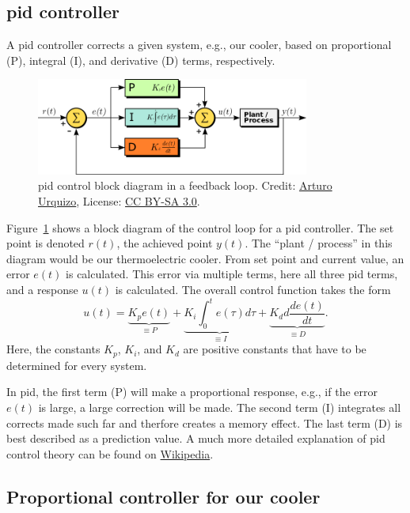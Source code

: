 \subsection{\ac{pid} controller}

A \ac{pid} controller corrects a given system, e.g., our cooler, based on proportional (P), integral (I), and derivative (D) terms, respectively. 
\begin{figure}[tb]
  \centering
  \includegraphics[width=0.8\textwidth]{graphics/06_further/pid.png}
  \caption{\ac{pid} control block diagram in a feedback loop. Credit: \href{https://en.wikipedia.org/wiki/File:PID_en.svg}{Arturo Urquizo}, License: \href{https://creativecommons.org/licenses/by-sa/3.0/deed.en}{CC BY-SA 3.0}.}
  \label{fig:outlook:pid}
\end{figure}
Figure~\ref{fig:outlook:pid} shows a block diagram of the control loop for a \ac{pid} controller. The set point is denoted $r(t)$, the achieved point $y(t)$. The ``plant / process'' in this diagram would be our thermoelectric cooler. From set point and current value, an error $e(t)$ is calculated. This error via multiple terms, here all three \ac{pid} terms, and a response $u(t)$ is calculated. The overall control function takes the form
\begin{equation}
u(t) = \underbrace{K_p e(t)}_{\equiv P} + \underbrace{K_i \int_0^t e(\tau) d\tau}_{\equiv I} + \underbrace{K_dd \frac{de(t)}{dt}}_{\equiv D}.
\end{equation}
Here, the constants $K_p$, $K_i$, and $K_d$ are positive constants that have to be determined for every system.

In \ac{pid}, the first term (P) will make a proportional response, e.g., if the error $e(t)$ is large, a large correction will be made. The second term (I) integrates all corrects made such far and therfore creates a memory effect. The last term (D) is best described as a prediction value. A much more detailed explanation of \ac{pid} control theory can be found on \href{https://en.wikipedia.org/wiki/PID_controller}{Wikipedia}.


\subsection{Proportional controller for our cooler}

